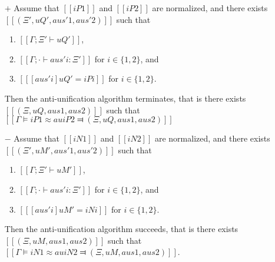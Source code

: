 \begin{lemma} \label{lemma:anti-unification-completeness}
    \hfill
    \begin{itemize}
        \item [$+$] 
            Assume that $[[iP1]]$ and $[[iP2]]$ are normalized, and
            there exists $[[(Ξ', uQ', aus'1, aus'2)]]$ such that
            \begin{enumerate}
                \item $[[Γ ; Ξ' ⊢ uQ']]$,
                \item $[[Γ ; · ⊢ aus'i : Ξ']]$ for $i \in \{1,2\}$, and
                \item $[[ [aus'i] uQ' = iPi ]]$ for $i \in \{1,2\}$.
            \end{enumerate}

            Then the anti-unification algorithm terminates, that is there exists
            $[[(Ξ, uQ, aus1, aus2)]]$ such that $[[Γ ⊨ iP1 ≈au iP2 ⫤ (Ξ, uQ, aus1, aus2)]]$

        \item [$-$] 
            Assume that $[[iN1]]$ and $[[iN2]]$ are normalized, and
            there exists $[[(Ξ', uM', aus'1, aus'2)]]$ such that
            \begin{enumerate}
                \item $[[Γ ; Ξ' ⊢ uM']]$,
                \item $[[Γ ; · ⊢ aus'i : Ξ']]$ for $i \in \{1,2\}$, and
                \item $[[ [aus'i] uM' = iNi ]]$ for $i \in \{1,2\}$.
            \end{enumerate}

            Then the anti-unification algorithm succeeds, that is 
            there exists $[[(Ξ, uM, aus1, aus2)]]$ such that
            $[[Γ ⊨ iN1 ≈au iN2 ⫤ (Ξ, uM, aus1, aus2)]]$.
    \end{itemize}
\end{lemma}
